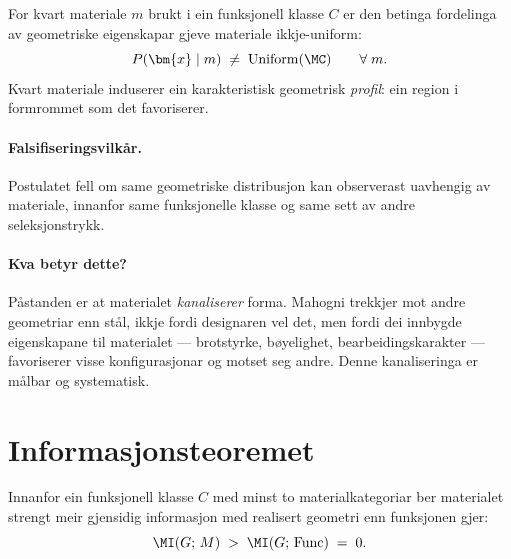 \begin{postmark}\label{post:L.6.1}
For kvart materiale $m$ brukt i ein funksjonell klasse $C$ er den
betinga fordelinga av geometriske eigenskapar gjeve materiale
ikkje-uniform:
\[
  P(\bm{x} \mid m) \;\neq\; \mathrm{Uniform}(\MC)
  \qquad \forall\; m.
\]
Kvart materiale induserer ein karakteristisk geometrisk
\emph{profil}: ein region i formrommet som det favoriserer.
\end{postmark}

\paragraph{Falsifiseringsvilkår.}
Postulatet fell om same geometriske distribusjon kan observerast
uavhengig av materiale, innanfor same funksjonelle klasse og
same sett av andre seleksjonstrykk.

\paragraph{Kva betyr dette?}
Påstanden er at materialet \emph{kanaliserer} forma. Mahogni
trekkjer mot andre geometriar enn stål, ikkje fordi designaren
vel det, men fordi dei innbygde eigenskapane til materialet ---
brotstyrke, bøyelighet, bearbeidingskarakter --- favoriserer visse
konfigurasjonar og motset seg andre. Denne kanaliseringa er
målbar og systematisk.


\section{Informasjonsteoremet}

\begin{satmark}[Informasjonsteoremet]\label{thm:L.6.2}
Innanfor ein funksjonell klasse $C$ med minst to materialkategoriar
ber materialet strengt meir gjensidig informasjon med realisert
geometri enn funksjonen gjer:
\[
  \MI(G;\, M) \;>\; \MI(G;\, \mathrm{Func}) \;=\; 0.
\]
\end{satmark}

